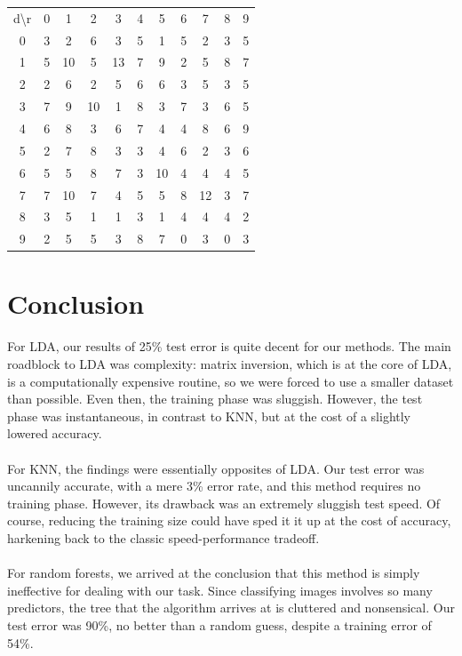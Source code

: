 \documentclass[10pt]{extarticle}
\begin{document}
\begin{minipage}{.4\textwidth}
\begin{tabular}{c c c c c c c c c c c}
 d\textbackslash r&0&1&2&3&4&5&6&7&8&9\\
 0&3&2&6&3&5&1&5&2&3&5\\
 1&5&10&5&13&7&9&2&5&8&7\\
 2&2&6&2&5&6&6&3&5&3&5\\
 3&7&9&10&1&8&3&7&3&6&5\\
 4&6&8&3&6&7&4&4&8&6&9\\
 5&2&7&8&3&3&4&6&2&3&6\\
 6&5&5&8&7&3&10&4&4&4&5\\
 7&7&10&7&4&5&5&8&12&3&7\\
 8&3&5&1&1&3&1&4&4&4&2\\
 9&2&5&5&3&8&7&0&3&0&3
 \end{tabular}
\end{minipage}
\section{Conclusion}
For LDA, our results of 25\% test error is quite decent for our methods. The main roadblock to LDA was complexity: matrix inversion, which is at the core of LDA, is a computationally expensive routine, so we were forced to use a smaller dataset than possible. Even then, the training phase was sluggish. However, the test phase was instantaneous, in contrast to KNN, but at the cost of a slightly lowered accuracy. \\\\
For KNN, the findings were essentially opposites of LDA. Our test error was uncannily accurate, with a mere 3\% error rate, and this method requires no training phase. However, its drawback was an extremely sluggish test speed. Of course, reducing the training size could have sped it it up at the cost of accuracy, harkening back to the classic speed-performance tradeoff. \\\\
For random forests, we arrived at the conclusion that this method is simply ineffective for dealing with our task. Since classifying images involves so many predictors, the tree that the algorithm arrives at is cluttered and nonsensical. Our test error was 90\%, no better than a random guess, despite a training error of 54\%. 
\end{document}
